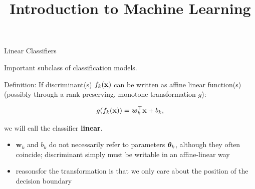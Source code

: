 \documentclass[11pt,compress,t,notes=noshow, xcolor=table]{beamer}
\title{Introduction to Machine Learning}
\begin{document}

\framebreak


\begin{vbframe}{Linear Classifiers}

Important subclass of classification models. 

\lz

Definition: 
If discriminant(s) $f_{k}(\mathbf{x})$ can be written as affine linear function(s)
(possibly through a rank-preserving, monotone transformation $g$):

$$
  g(f_{k}(\mathbf{x})) = \bm{w}_k^\top \mathbf{x} + b_k,
$$

we will call the classifier \textbf{linear}. 

\vfill

\begin{itemize}
\item $\bm{w}_k$ and $b_k$ do not necessarily refer to parameters $\bm{\theta}_k$, although they often coincide; discriminant simply must be writable in an affine-linear way 
\item reasonsfor the transformation is that we only care about the position of the decision boundary
\end{itemize}


\end{vbframe}
\end{document}

